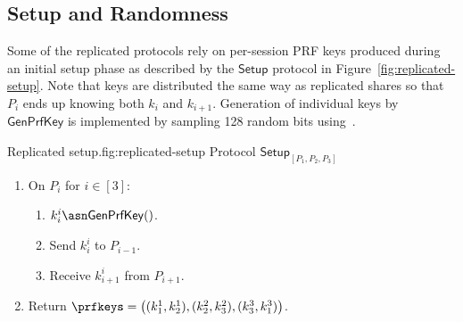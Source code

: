 \subsection{Setup and Randomness}

Some of the replicated protocols rely on per-session PRF keys produced during an initial setup phase as described by the $\mathsf{Setup}$ protocol in Figure~\ref{fig:replicated-setup}. Note that keys are distributed the same way as replicated shares so that $P_i$ ends up knowing both $k_i$ and $k_{i+1}$. Generation of individual keys by $\mathsf{GenPrfKey}$ is implemented by sampling 128 random bits using~\cite{libsodium}.

\begin{Boxfig}{Replicated setup.}{fig:replicated-setup}
  {Protocol $\mathsf{Setup}_{[P_1, P_2, P_3]}$}
  
  \begin{enumerate}
  \item On $P_i$ for $i \in [3]$:
  \begin{enumerate}
    \item $k^{i}_{i} \asn \mathsf{GenPrfKey}()$.
    \item Send $k^{i}_{i}$ to $P_{i-1}$.
    \item Receive $k^{i}_{i+1}$ from $P_{i+1}$.
  \end{enumerate}
  
  \item Return $\prfkeys = \left( (k^1_1, k^1_2), (k^2_2, k^2_3), (k^3_3, k^3_1) \right)$.
  \end{enumerate}
\end{Boxfig}

